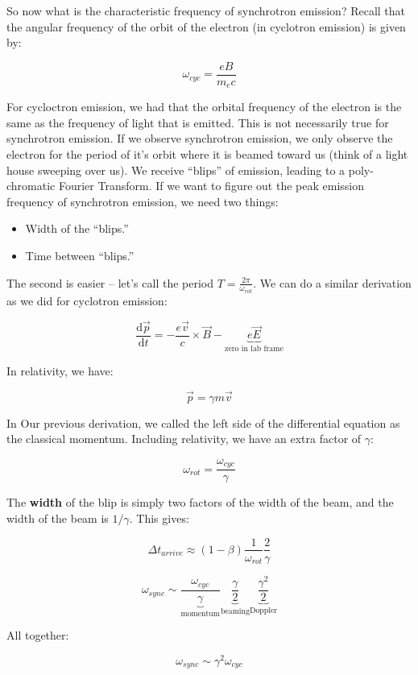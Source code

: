 \documentclass{article}
\def\Bfield{{\vec{B}}}
\def\Efield{{\vec {E}}}
\begin{document}
So now what is the characteristic frequency of synchrotron emission? Recall that the angular frequency of the orbit of the electron (in cyclotron emission) is given by:

$$
\omega_{cyc} = \frac{eB}{m_e c}
$$

For cycloctron emission, we had that the orbital frequency of the electron is the same as the frequency of light that is emitted. This is not necessarily true for synchrotron emission. If we observe synchrotron emission, we only observe the electron for the period of it's orbit where it is beamed toward us (think of a light house sweeping over us). We receive ``blips'' of emission, leading to a poly-chromatic Fourier Transform. If we want to figure out the peak emission frequency of synchrotron emission, we need two things:

\begin{itemize}
    \item Width of the ``blips.''
    \item Time between ``blips.''
\end{itemize}

The second is easier -- let's call the period $T = \frac{2\pi}{\omega_{rot}}$. We can do a similar derivation as we did for cyclotron emission:

$$
\frac{\mathrm{d}\vec{p}}{\mathrm{d}t} = -\frac{e\vec{v}}{c}\times \Bfield - \underbrace{e \Efield}_\text{zero in lab frame}
$$

In relativity, we have:

$$
\vec{p} = \gamma m \vec{v}
$$

In Our previous derivation, we called the left side of the differential equation as the classical momentum. Including relativity, we have an extra factor of $\gamma$:

$$
\omega_{rot} = \frac{\omega_{cyc}}{\gamma}
$$

The \textbf{width} of the blip is simply two factors of the width of the beam, and the width of the beam is $1/\gamma$. This gives:


$$
\Delta t_{arrive} \approx \left(1-\beta\right)\frac{1}{\omega_{rot}}\frac{2}{\gamma} 
$$

$$
\omega_{sync} \sim \frac{\omega_{cyc}}{\underbrace{\gamma}_\text{momentum}} \underbrace{\frac{\gamma}{2}}_\text{beaming}\underbrace{\frac{\gamma^2}{2}}_\text{Doppler}
$$

All together:

$$
\boxed{\omega_{sync} \sim \gamma^2 \omega_{cyc}}
$$
\end{document}
